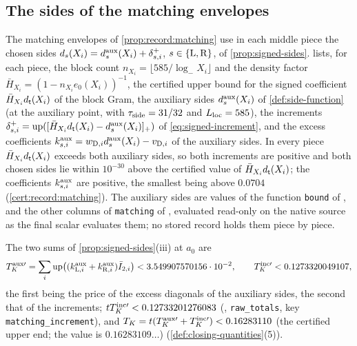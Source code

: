 \subsection{The sides of the matching envelopes}\label{subsec:data:aux}

The matching envelopes of \cref{prop:record:matching} use in each middle piece
the chosen sides $d_s(X_i)=d^{\rm aux}_s(X_i)+\delta^+_{s,i}$,
$s\in\{{\rm L},{\rm R}\}$, of \cref{prop:signed-sides}.
 lists, for each piece, the block count
$n_{X_i}=\lfloor585/\log_-X_i\rfloor$ and the density factor
$\bar H_{X_i}=(1-n_{X_i}e_0(X_i))^{-1}$, the certified upper bound for the signed
coefficient $\bar H_{X_i}d_\mathsf t(X_i)$ of the block Gram, the auxiliary sides
$d^{\rm aux}_s(X_i)$ of \cref{def:side-function} (at the auxiliary point, with
$\tau_{\mathrm{side}}=31/32$ and $L_{\rm loc}=585$), the increments
$\delta^+_{s,i}=\operatorname{up}([\bar H_{X_i}d_\mathsf t(X_i)-d^{\rm aux}_s(X_i)]_+)$ of
\eqref{eq:signed-increment}, and the excess coefficients
$k^{\rm aux}_{s,i}=w_{{\rm D},i}d^{\rm aux}_s(X_i)-v_{{\rm D},i}$ of the auxiliary
sides. In every piece $\bar H_{X_i}d_\mathsf t(X_i)$ exceeds both auxiliary sides, so
both increments are positive and both chosen sides lie within $10^{-30}$ above the
certified value of $\bar H_{X_i}d_\mathsf t(X_i)$; the coefficients $k^{\rm aux}_{s,i}$
are positive, the smallest being above $0.0704$
(\cref{cert:record:matching}). The auxiliary sides are values of the function
\texttt{bound} of
, and the
other columns of \texttt{matching} of
, evaluated read-only on
the native source as the final scalar evaluates them; no stored record holds
them piece by piece.

The two sums of \cref{prop:signed-sides}(iii) at $a_0$ are
\[
 T^{\rm aux\prime}_K=\sum_i\operatorname{up}\bigl((k^{\rm aux}_{{\rm L},i}
 +k^{\rm aux}_{{\rm R},i})\bar I_{2,i}\bigr)<3.549907570156\cdot10^{-2},\qquad
 T^{\rm inc\prime}_K<0.1273320049107,
\]
the first being the price of the excess diagonals of the auxiliary sides, the
second that of the increments; $tT^{\rm inc\prime}_K<0.12733201276083$
(, \texttt{raw\_totals}, key \texttt{matching\_increment}), and
$T_K=t(T^{\rm aux\prime}_K+T^{\rm inc\prime}_K)<0.16283110$
(the certified upper end; the value is $0.16283109\ldots$)
(\cref{def:closing-quantities}(5)).

